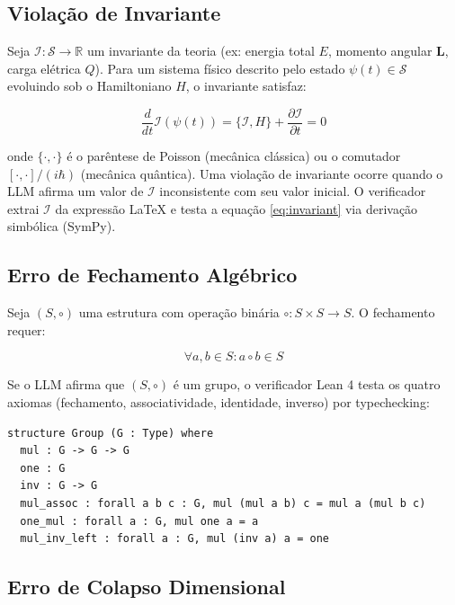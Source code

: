 \documentclass[5p]{elsarticle}
\theoremstyle{remark}
\begin{document}
\subsection{Violação de Invariante}

Seja $\mathcal{I}: \mathcal{S} \to \mathbb{R}$ um invariante da teoria (ex: energia total $E$, momento angular $\mathbf{L}$, carga elétrica $Q$). Para um sistema físico descrito pelo estado $\psi(t) \in \mathcal{S}$ evoluindo sob o Hamiltoniano $H$, o invariante satisfaz:

\begin{equation}
\frac{d}{dt}\mathcal{I}(\psi(t)) = \{\mathcal{I}, H\} + \frac{\partial \mathcal{I}}{\partial t} = 0
\label{eq:invariant}
\end{equation}

onde $\{\cdot, \cdot\}$ é o parêntese de Poisson (mecânica clássica) ou o comutador $[\cdot, \cdot]/(i\hbar)$ (mecânica quântica). Uma violação de invariante ocorre quando o LLM afirma um valor de $\mathcal{I}$ inconsistente com seu valor inicial. O verificador extrai $\mathcal{I}$ da expressão LaTeX e testa a equação \ref{eq:invariant} via derivação simbólica (SymPy).

\subsection{Erro de Fechamento Algébrico}

Seja $(S, \circ)$ uma estrutura com operação binária $\circ: S \times S \to S$. O fechamento requer:

\begin{equation}
\forall a, b \in S: a \circ b \in S
\label{eq:closure}
\end{equation}

Se o LLM afirma que $(S, \circ)$ é um grupo, o verificador Lean 4 testa os quatro axiomas (fechamento, associatividade, identidade, inverso) por typechecking:

\begin{verbatim}
structure Group (G : Type) where
  mul : G -> G -> G
  one : G
  inv : G -> G
  mul_assoc : forall a b c : G, mul (mul a b) c = mul a (mul b c)
  one_mul : forall a : G, mul one a = a
  mul_inv_left : forall a : G, mul (inv a) a = one
\end{verbatim}

\subsection{Erro de Colapso Dimensional}
\end{document}

